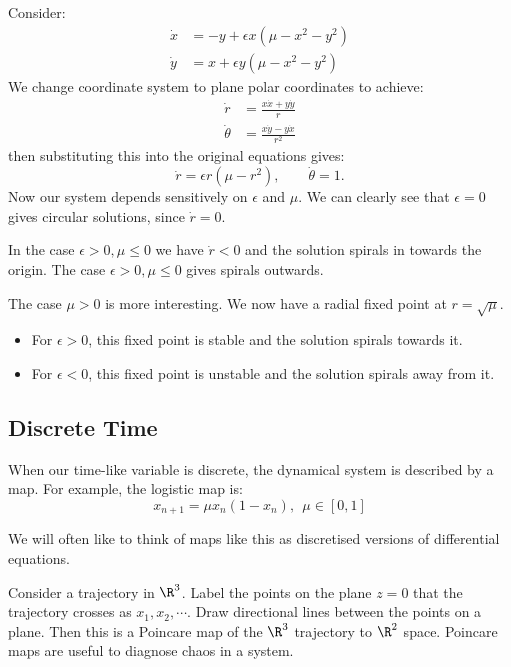 \documentclass[../Main.tex]{subfiles}
\begin{document}
\begin{example}\label{exPolarSpirals}
    Consider:
    \begin{align*}
        \dot{x} &= -y + \epsilon x(\mu - x^2 - y^2) \\
        \dot{y} &= x + \epsilon y (\mu - x^2 - y^2)
    \end{align*}
    We change coordinate system to plane polar coordinates to achieve:
    \begin{align*}
        \dot{r} &= \frac{x\dot{x} + y\dot{y}}{r} \\
        \dot{\theta} &= \frac{x\dot{y} - y\dot{x}}{r^2}
    \end{align*}
    then substituting this into the original equations gives:
    \begin{equation*}
        \dot{r} = \epsilon r(\mu - r^2),\qquad\dot{\theta} = 1.
    \end{equation*}
    Now our system depends sensitively on $\epsilon$ and $\mu$. We can clearly see that $\epsilon = 0$ gives circular solutions, since $\dot{r} = 0$.

    In the case $\epsilon > 0, \mu \leq 0$ we have $\dot{r} < 0$ and the solution spirals in towards the origin. The case $\epsilon > 0, \mu \leq 0$ gives spirals outwards.

    The case $\mu > 0$ is more interesting. We now have a radial fixed point at $r = \sqrt{\mu}$.
    \begin{itemize}
        \item For $\epsilon > 0$, this fixed point is stable and the solution spirals towards it.
        \item For $\epsilon < 0$, this fixed point is unstable and the solution spirals away from it.
    \end{itemize}
\end{example}
\subsection{Discrete Time}
When our time-like variable is discrete, the dynamical system is described by a map. For example, the logistic map is:
\begin{equation*}
    x_{n+1} = \mu x_n(1-x_n),~~\mu \in [0, 1]
\end{equation*}

We will often like to think of maps like this as discretised versions of differential equations.

\begin{example}
    Consider a trajectory in $\R^3$. Label the points on the plane $z = 0$ that the trajectory crosses as $x_1, x_2, \cdots$. Draw directional lines between the points on a plane. Then this is a Poincare map of the $\R^3$ trajectory to $\R^2$ space. Poincare maps are useful to diagnose chaos in a system.
\end{example}
\end{document}

